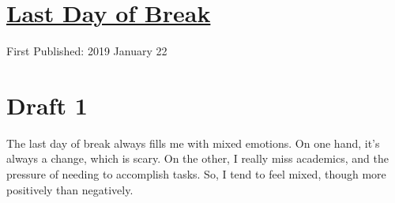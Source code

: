 \documentclass[12pt]{article}[titlepage]
\newcommand{\1}{\={a}}
\newcommand{\2}{\={e}}
\newcommand{\3}{\={\i}}
\newcommand{\4}{\=o}
\newcommand{\5}{\=u}
\newcommand{\6}{\={A}}
\renewcommand{\,}{\textsuperscript{,}}
\begin{document}
\doublespacing
\section{\href{last-day-of-break.html}{Last Day of Break}}
First Published: 2019 January 22
\section{Draft 1}
The last day of break always fills me with mixed emotions.
On one hand, it's always a change, which is scary.
On the other, I really miss academics, and the pressure of needing to accomplish tasks.
So, I tend to feel mixed, though more positively than negatively.
\end{document}
